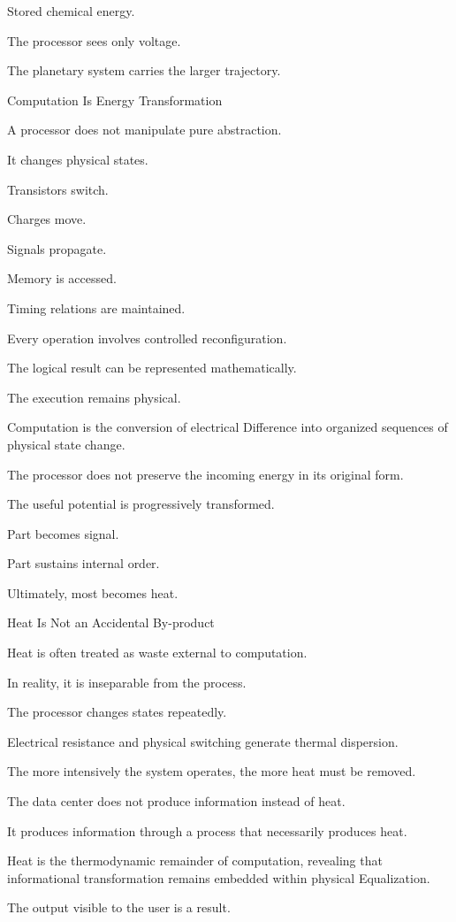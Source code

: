Stored chemical energy.

The processor sees only voltage.

The planetary system carries the larger trajectory.

Computation Is Energy Transformation

A processor does not manipulate pure abstraction.

It changes physical states.

Transistors switch.

Charges move.

Signals propagate.

Memory is accessed.

Timing relations are maintained.

Every operation involves controlled reconfiguration.

The logical result can be represented mathematically.

The execution remains physical.

Computation is the conversion of electrical Difference into organized sequences of physical state change.

The processor does not preserve the incoming energy in its original form.

The useful potential is progressively transformed.

Part becomes signal.

Part sustains internal order.

Ultimately, most becomes heat.

Heat Is Not an Accidental By-product

Heat is often treated as waste external to computation.

In reality, it is inseparable from the process.

The processor changes states repeatedly.

Electrical resistance and physical switching generate thermal dispersion.

The more intensively the system operates, the more heat must be removed.

The data center does not produce information instead of heat.

It produces information through a process that necessarily produces heat.

Heat is the thermodynamic remainder of computation, revealing that informational transformation remains embedded within physical Equalization.

The output visible to the user is a result.

